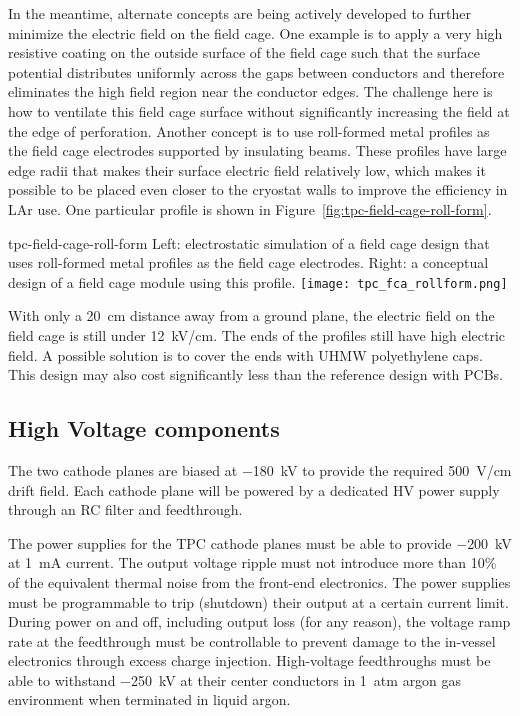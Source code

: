 In the meantime, alternate concepts are being actively developed to
further minimize the electric field on the field cage.  One example is
to apply a very high resistive coating on the outside surface of the
field cage such that the surface potential distributes uniformly
across the gaps between conductors and therefore eliminates the high field
region near the conductor edges.  The challenge here is how to
ventilate this field cage surface without significantly increasing the
field at the edge of perforation.  Another concept is to use
roll-formed metal profiles as the field cage electrodes supported by
insulating beams.  These profiles have large edge radii that makes
their surface electric field relatively low, which makes it possible
to be placed even closer to the cryostat walls to improve the
efficiency in LAr use.  One particular profile is shown in
Figure~\ref{fig:tpc-field-cage-roll-form}.  
\begin{cdrfigure}{tpc-field-cage-roll-form}
{Left: electrostatic simulation of a field cage design that uses roll-formed 
metal profiles as the field cage electrodes.  Right: a conceptual design of a 
field cage module using this profile.}
\texttt{[image: tpc\_fca\_rollform.png]}
\end{cdrfigure}
With only a 20~cm distance
away from a ground plane, the electric field on the field cage is
still under 12~kV/cm.  The ends of the profiles still have high
electric field.  A possible solution is to cover the ends with UHMW
polyethylene caps.  This design may also cost significantly less than
the reference design with PCBs.



\subsection{High Voltage components}  
\label{subsec:fd-ref-hv}
   
The two cathode planes are biased at $-$180~kV to provide the required
500~V/cm drift field. Each cathode plane will be powered by a
dedicated HV power supply through an RC filter and feedthrough.

The power supplies for the TPC cathode planes must be able to provide
$-$200~kV at 1~mA current. The output voltage ripple must not
introduce more than 10\% of the equivalent thermal noise from the
front-end electronics.  The power supplies must be programmable to
trip (shutdown) their output at a certain current limit.  During power
on and off, including output loss (for any reason), the voltage ramp
rate at the feedthrough must be controllable to prevent damage to the
in-vessel electronics through excess charge injection.  High-voltage
feedthroughs must be able to withstand $-$250~kV at their center
conductors in 1~atm argon gas environment when terminated in liquid
argon.


